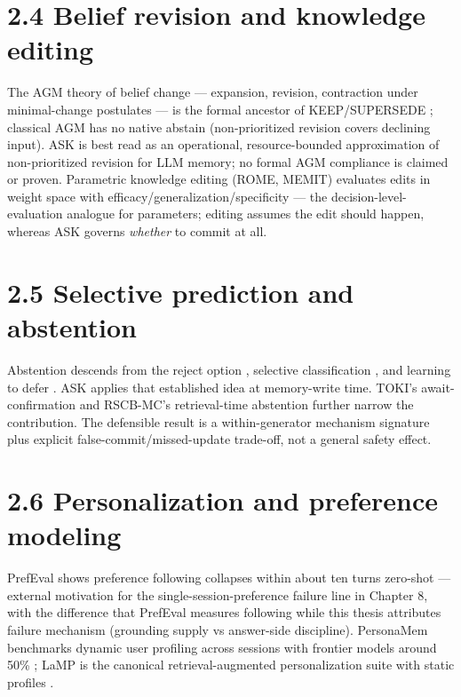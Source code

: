 \section{2.4 Belief revision and knowledge
editing}\label{belief-revision-and-knowledge-editing}

The AGM theory of belief change --- expansion, revision, contraction
under minimal-change postulates --- is the formal ancestor of
KEEP/SUPERSEDE \citep{alchourron1985theory}; classical AGM has no native
abstain (non-prioritized revision covers declining input). ASK is best
read as an operational, resource-bounded approximation of
non-prioritized revision for LLM memory; no formal AGM compliance is
claimed or proven. Parametric knowledge editing (ROME, MEMIT) evaluates
edits in weight space with efficacy/generalization/specificity
\citep{meng2022rome, meng2023memit} --- the decision-level-evaluation
analogue for parameters; editing assumes the edit should happen, whereas
ASK governs \emph{whether} to commit at all.

\section{2.5 Selective prediction and
abstention}\label{selective-prediction-and-abstention}

Abstention descends from the reject option \citep{chow1970reject},
selective classification
\citep{elyaniv2010selective, geifman2017selective}, and learning to
defer \citep{madras2018predict, mozannar2020consistent}. ASK applies
that established idea at memory-write time. TOKI's await-confirmation
and RSCB-MC's retrieval-time abstention further narrow the contribution.
The defensible result is a within-generator mechanism signature plus
explicit false-commit/missed-update trade-off, not a general safety
effect.

\section{2.6 Personalization and preference
modeling}\label{personalization-and-preference-modeling}

PrefEval shows preference following collapses within about ten turns
zero-shot \citep{zhao2025prefeval} --- external motivation for the
single-session-preference failure line in Chapter 8, with the difference
that PrefEval measures following while this thesis attributes failure
mechanism (grounding supply vs answer-side discipline). PersonaMem
benchmarks dynamic user profiling across sessions with frontier models
around 50\% \citep{jiang2025personamem}; LaMP is the canonical
retrieval-augmented personalization suite with static profiles
\citep{salemi2023lamp}.


